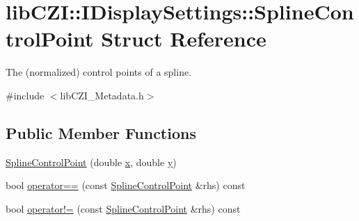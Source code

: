 \hypertarget{structlib_c_z_i_1_1_i_display_settings_1_1_spline_control_point}{}\section{lib\+C\+ZI\+:\+:I\+Display\+Settings\+:\+:Spline\+Control\+Point Struct Reference}
\label{structlib_c_z_i_1_1_i_display_settings_1_1_spline_control_point}


The (normalized) control points of a spline.  




{\ttfamily \#include $<$lib\+C\+Z\+I\+\_\+\+Metadata.\+h$>$}

\subsection*{Public Member Functions}
\begin{DoxyCompactItemize}
\item 
\hyperlink{structlib_c_z_i_1_1_i_display_settings_1_1_spline_control_point_a0e35162e74f26a816a5e75443209b559}{Spline\+Control\+Point} (double \hyperlink{structlib_c_z_i_1_1_i_display_settings_1_1_spline_control_point_a1978764701b7179c6e5fd045dc88fe9a}{x}, double \hyperlink{structlib_c_z_i_1_1_i_display_settings_1_1_spline_control_point_a3cce749fa57f428f61d93f55c617becb}{y})
\item 
bool \hyperlink{structlib_c_z_i_1_1_i_display_settings_1_1_spline_control_point_ac81ec8f0c154cc1d840c1af1e9d46fd8}{operator==} (const \hyperlink{structlib_c_z_i_1_1_i_display_settings_1_1_spline_control_point}{Spline\+Control\+Point} \&rhs) const
\item 
bool \hyperlink{structlib_c_z_i_1_1_i_display_settings_1_1_spline_control_point_a2cb37002034da0bbe0ad9972358d3d5a}{operator!=} (const \hyperlink{structlib_c_z_i_1_1_i_display_settings_1_1_spline_control_point}{Spline\+Control\+Point} \&rhs) const
\end{DoxyCompactItemize}
